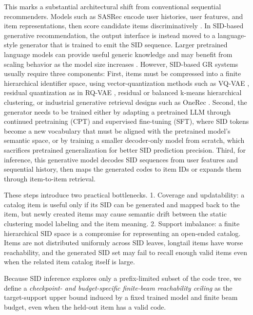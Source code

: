 \documentclass[letterpaper]{article}
\newcommand{\hx}[1]{\textcolor{red}{[HX: #1]}}
\begin{document}
This marks a substantial architectural shift from conventional sequential recommenders. Models such as SASRec encode user histories, user features, and item representations, then score candidate items discriminatively \citep{kang2018sasrec}. In SID-based generative recommendation, the output interface is instead moved to a language-style generator that is trained to emit the SID sequence. Larger pretrained language models can provide useful generic knowledge and may benefit from scaling behavior as the model size increases \citep{kaplan2020scaling}. However, SID-based GR systems usually require three components: First, items must be compressed into a finite hierarchical identifier space, using vector-quantization methods such as VQ-VAE \citep{vandenoord2017vqvae}, residual quantization as in RQ-VAE \citep{lee2022rqvae}, residual or balanced k-means hierarchical clustering, or industrial generative retrieval designs such as OneRec \citep{deng2025onerec}. Second, the generator needs to be trained either by adapting a pretrained LLM through continued pretraining (CPT) and supervised fine-tuning (SFT), where SID tokens become a new vocabulary that must be aligned with the pretrained model's semantic space, or by training a smaller decoder-only model from scratch, which sacrifices pretrained generalization for better SID prediction precision. Third, for inference, this generative model decodes SID sequences from user features and sequential history, then maps the generated codes to item IDs or expands them through item-to-item retrieval. 

These steps introduce two practical bottlenecks. 1. Coverage and updatability: a catalog item is useful only if its SID can be generated and mapped back to the item, but newly created items may cause semantic drift between the static clustering model labeling and the item meaning. 2. Support imbalance: a finite hierarchical SID space is a compromise for representing an open-ended catalog. Items are not distributed uniformly across SID leaves, longtail items have worse reachability, and the generated SID set may fail to recall enough valid items even when the related item catalog itself is large.

Because SID inference explores only a prefix-limited subset of the code tree,
we define a \emph{checkpoint- and budget-specific finite-beam reachability
ceiling} as the target-support upper bound induced by a fixed trained model and finite beam budget, even when
the held-out item has a valid code.
\end{document}
